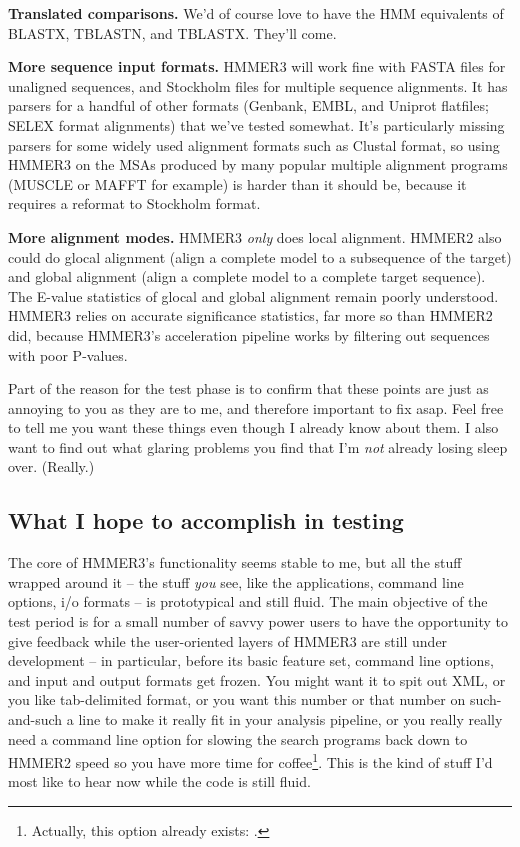 \textbf{Translated comparisons.} We'd of course love to have the HMM
equivalents of BLASTX, TBLASTN, and TBLASTX. They'll come.

\textbf{More sequence input formats.} HMMER3 will work fine with FASTA
files for unaligned sequences, and Stockholm files for multiple
sequence alignments. It has parsers for a handful of other formats
(Genbank, EMBL, and Uniprot flatfiles; SELEX format alignments) that
we've tested somewhat. It's particularly missing parsers for some
widely used alignment formats such as Clustal format, so using HMMER3
on the MSAs produced by many popular multiple alignment programs
(MUSCLE or MAFFT for example) is harder than it should be, because it
requires a reformat to Stockholm format.

\textbf{More alignment modes.} HMMER3 \emph{only} does local
alignment. HMMER2 also could do glocal alignment (align a complete
model to a subsequence of the target) and global alignment (align a
complete model to a complete target sequence). The E-value statistics
of glocal and global alignment remain poorly understood. HMMER3 relies
on accurate significance statistics, far more so than HMMER2 did,
because HMMER3's acceleration pipeline works by filtering out
sequences with poor P-values.

\begin{sidebar}
Part of the reason for the test phase is to confirm that these points
are just as annoying to you as they are to me, and therefore important
to fix asap. Feel free to tell me you want these things even though I
already know about them. I also want to find out what glaring problems
you find that I'm \emph{not} already losing sleep over. (Really.)
\end{sidebar}



\subsection{What I hope to accomplish in testing}

The core of HMMER3's functionality seems stable to me, but all the
stuff wrapped around it -- the stuff \emph{you} see, like the
applications, command line options, i/o formats -- is prototypical and
still fluid.  The main objective of the test period is for a
small number of savvy power users to have the opportunity to give
feedback while the user-oriented layers of HMMER3 are still under
development -- in particular, before its basic feature set, command
line options, and input and output formats get frozen. You might want
it to spit out XML, or you like tab-delimited format, or you want this
number or that number on such-and-such a line to make it really fit in
your analysis pipeline, or you really really need a command line
option for slowing the search programs back down to HMMER2 speed so
you have more time for coffee\footnote{Actually, this option already
exists: .}. This is the kind of stuff I'd most like to
hear now while the code is still fluid.

